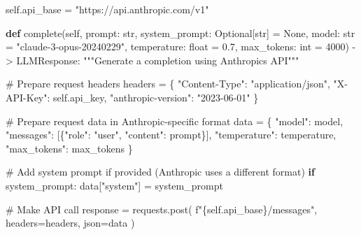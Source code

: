 \documentclass[
  11pt,
  letterpaper,
]{book}
\newenvironment{Shaded}{\begin{snugshade}}{\end{snugshade}}
\newcommand{\BuiltInTok}[1]{\textcolor[rgb]{0.00,0.23,0.31}{#1}}
\newcommand{\CommentTok}[1]{\textcolor[rgb]{0.37,0.37,0.37}{#1}}
\newcommand{\ControlFlowTok}[1]{\textcolor[rgb]{0.00,0.23,0.31}{\textbf{#1}}}
\newcommand{\DecValTok}[1]{\textcolor[rgb]{0.68,0.00,0.00}{#1}}
\newcommand{\FloatTok}[1]{\textcolor[rgb]{0.68,0.00,0.00}{#1}}
\newcommand{\KeywordTok}[1]{\textcolor[rgb]{0.00,0.23,0.31}{\textbf{#1}}}
\newcommand{\NormalTok}[1]{\textcolor[rgb]{0.00,0.23,0.31}{#1}}
\newcommand{\OperatorTok}[1]{\textcolor[rgb]{0.37,0.37,0.37}{#1}}
\newcommand{\SpecialCharTok}[1]{\textcolor[rgb]{0.37,0.37,0.37}{#1}}
\newcommand{\SpecialStringTok}[1]{\textcolor[rgb]{0.13,0.47,0.30}{#1}}
\newcommand{\StringTok}[1]{\textcolor[rgb]{0.13,0.47,0.30}{#1}}
\newcommand{\VariableTok}[1]{\textcolor[rgb]{0.07,0.07,0.07}{#1}}
\begin{document}
\begin{Shaded}
\begin{Highlighting}[]
        \VariableTok{self}\NormalTok{.api\_base }\OperatorTok{=} \StringTok{"https://api.anthropic.com/v1"}

    \KeywordTok{def}\NormalTok{ complete(}\VariableTok{self}\NormalTok{,}
\NormalTok{                prompt: }\BuiltInTok{str}\NormalTok{,}
\NormalTok{                system\_prompt: Optional[}\BuiltInTok{str}\NormalTok{] }\OperatorTok{=} \VariableTok{None}\NormalTok{,}
\NormalTok{                model: }\BuiltInTok{str} \OperatorTok{=} \StringTok{"claude{-}3{-}opus{-}20240229"}\NormalTok{,}
\NormalTok{                temperature: }\BuiltInTok{float} \OperatorTok{=} \FloatTok{0.7}\NormalTok{,}
\NormalTok{                max\_tokens: }\BuiltInTok{int} \OperatorTok{=} \DecValTok{4000}\NormalTok{) }\OperatorTok{{-}\textgreater{}}\NormalTok{ LLMResponse:}
        \CommentTok{"""Generate a completion using Anthropic\textquotesingle{}s API"""}

        \CommentTok{\# Prepare request headers}
\NormalTok{        headers }\OperatorTok{=}\NormalTok{ \{}
            \StringTok{"Content{-}Type"}\NormalTok{: }\StringTok{"application/json"}\NormalTok{,}
            \StringTok{"X{-}API{-}Key"}\NormalTok{: }\VariableTok{self}\NormalTok{.api\_key,}
            \StringTok{"anthropic{-}version"}\NormalTok{: }\StringTok{"2023{-}06{-}01"}
\NormalTok{        \}}

        \CommentTok{\# Prepare request data in Anthropic{-}specific format}
\NormalTok{        data }\OperatorTok{=}\NormalTok{ \{}
            \StringTok{"model"}\NormalTok{: model,}
            \StringTok{"messages"}\NormalTok{: [\{}\StringTok{"role"}\NormalTok{: }\StringTok{"user"}\NormalTok{, }\StringTok{"content"}\NormalTok{: prompt\}],}
            \StringTok{"temperature"}\NormalTok{: temperature,}
            \StringTok{"max\_tokens"}\NormalTok{: max\_tokens}
\NormalTok{        \}}

        \CommentTok{\# Add system prompt if provided (Anthropic uses a different format)}
        \ControlFlowTok{if}\NormalTok{ system\_prompt:}
\NormalTok{            data[}\StringTok{"system"}\NormalTok{] }\OperatorTok{=}\NormalTok{ system\_prompt}

        \CommentTok{\# Make API call}
\NormalTok{        response }\OperatorTok{=}\NormalTok{ requests.post(}
            \SpecialStringTok{f"}\SpecialCharTok{\{}\VariableTok{self}\SpecialCharTok{.}\NormalTok{api\_base}\SpecialCharTok{\}}\SpecialStringTok{/messages"}\NormalTok{,}
\NormalTok{            headers}\OperatorTok{=}\NormalTok{headers,}
\NormalTok{            json}\OperatorTok{=}\NormalTok{data}
\NormalTok{        )}


\end{Highlighting}
\end{Shaded}
\end{document}
